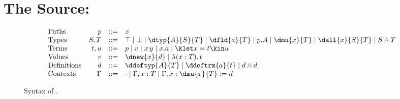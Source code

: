 \mathsrc
\section{The Source: \DOTMNF}\label{sec:source}

\begin{figure}
\small
\color{srccol}
\[
\begin{array}{@{}lrcl@{}}
\text{Paths} & p & ::= & x \\
\text{Types} & S,T & ::= & \top \mid \bot \mid \dtyp{A}{S}{T} \mid \dfld{a}{T} \mid p.A \mid \dmu{x}{T} \mid \dall{x}{S}{T} \mid S \wedge T \\
\text{Terms} & t,u & ::= & p \mid v \mid x\,y \mid x.a \mid \klet x = t \kin u \\
\text{Values} & v & ::= & \dnew{x}{d} \mid \lambda(x : T).\,t \\
\text{Definitions} & d & ::= & \ddeftyp{A}{T} \mid \ddeftrm{a}{t} \mid d \wedge d \\
\text{Contexts} & \Gamma & ::= & \cdot \mid \Gamma, x : T \mid \Gamma, x : \dmu{x}{T} \mathrel{:=} d
\end{array}
\]
\color{black}
\caption{Syntax of \DOTMNF.}
\label{fig:source-syntax}
\end{figure}

